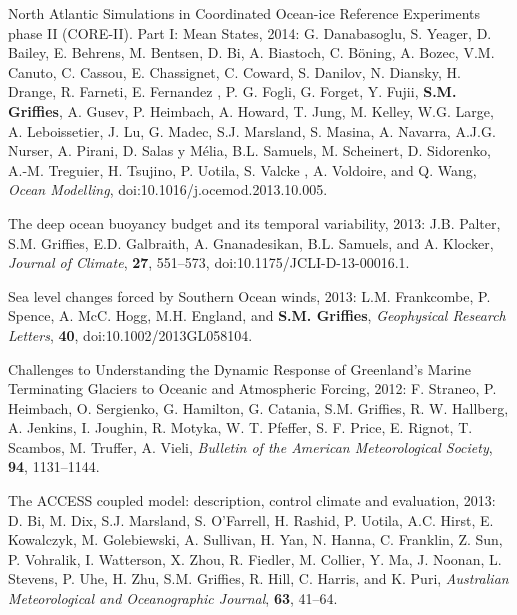 \begin{etaremune}
\item North Atlantic Simulations in Coordinated Ocean-ice Reference
  Experiments phase II (CORE-II). Part I: Mean States, 2014: G.
  Danabasoglu, S. Yeager, D. Bailey, E. Behrens, M. Bentsen, D. Bi,
  A. Biastoch, C. {B\"{o}ning}, A. Bozec, V.M. Canuto, C. Cassou,
  E. Chassignet, C. Coward, S. Danilov, N. Diansky, H. Drange,
  R. Farneti, E. Fernandez , P. G. Fogli, G. Forget, Y. Fujii, {\bf
    S.M. Grif\/f\/ies}, A.  Gusev, P. Heimbach, A.  Howard, T. Jung,
  M. Kelley, W.G. Large, A. Leboissetier, J. Lu, G. Madec,
  S.J. Marsland, S. Masina, A. Navarra, A.J.G. Nurser, A. Pirani,
  D. Salas y {M\'{e}lia}, B.L. Samuels, M. Scheinert, D. Sidorenko,
  A.-M. Treguier, H. Tsujino, P.   Uotila, S. Valcke , A. Voldoire, and
  Q. Wang, {\it Ocean Modelling}, doi:10.1016/j.ocemod.2013.10.005.

\item The deep ocean buoyancy budget and its temporal variability,
  2013: J.B. Palter, S.M. Grif\/f\/ies, E.D. Galbraith,
  A. Gnanadesikan, B.L. Samuels, and A. Klocker, {\it Journal of
    Climate}, {\bf 27}, 551--573,
  doi:10.1175/JCLI-D-13-00016.1.

\item Sea level changes forced by Southern Ocean winds, 2013:
  L.M. Frankcombe, P. Spence, A. McC. Hogg, M.H. England, and {\bf S.M. Grif\/f\/ies}, {\it Geophysical Research Letters}, {\bf 40},  doi:10.1002/2013GL058104.

\item Challenges to Understanding the Dynamic Response of Greenland's
  Marine Terminating Glaciers to Oceanic and Atmospheric Forcing,
  2012: F. Straneo, P. Heimbach, O. Sergienko, G. Hamilton,
  G. Catania, S.M. Grif\/f\/ies, R. W. Hallberg, A. Jenkins,
  I. Joughin, R. Motyka, W. T. Pfeffer, S. F. Price, E. Rignot,
  T. Scambos, M. Truffer, A. Vieli, {\it Bulletin of the American
    Meteorological Society}, {\bf 94}, 1131--1144.

\item The ACCESS coupled model: description, control climate and
  evaluation, 2013: D. Bi, M. Dix, S.J. Marsland, S. O'Farrell,
  H. Rashid, P. Uotila, A.C. Hirst, E. Kowalczyk, M. Golebiewski,
  A. Sullivan, H. Yan, N. Hanna, C. Franklin, Z. Sun, P. Vohralik,
  I. Watterson, X. Zhou, R. Fiedler, M. Collier, Y. Ma, J. Noonan,
  L. Stevens, P. Uhe, H. Zhu, S.M. Grif\/f\/ies, R. Hill,
  C. Harris, and K. Puri, {\it Australian Meteorological and
    Oceanographic Journal}, {\bf 63}, 41--64.


\end{etaremune}
